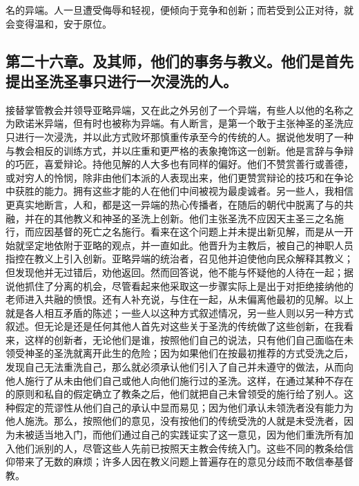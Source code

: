 名的异端。人一旦遭受侮辱和轻视，便倾向于竞争和创新；而若受到公正对待，就会变得温和，安于原位。\par


\subsection{第二十六章。及其师，他们的事务与教义。他们是首先提出圣洗圣事只进行一次浸洗的人。}

接替掌管教会并领导亚略异端，又在此之外另创了一个异端，有些人以他的名称之为欧诺米异端，但有时也被称为异端。有人断言，是第一个敢于主张神圣的圣洗应只进行一次浸洗，并以此方式败坏那慎重传承至今的传统的人。据说他发明了一种与教会相反的训练方式，并以庄重和更严格的表象掩饰这一创新。他是言辞与争辩的巧匠，喜爱辩论。持他见解的人大多也有同样的偏好。他们不赞赏善行或善德，或对穷人的怜悯，除非由他们本派的人表现出来，他们更赞赏辩论的技巧和在争论中获胜的能力。拥有这些才能的人在他们中间被视为最虔诚者。另一些人，我相信更真实地断言，人和，都是这一异端的热心传播者，在随后的朝代中脱离了与的共融，并在的其他教义和神圣的圣洗上创新。他们主张圣洗不应因天主圣三之名施行，而应因基督的死亡之名施行。看来在这个问题上并未提出新见解，而是从一开始就坚定地依附于亚略的观点，并一直如此。他晋升为主教后，被自己的神职人员指控在教义上引入创新。亚略异端的统治者，召见他并迫使他向民众解释其教义；但发现他并无过错后，劝他返回。然而回答说，他不能与怀疑他的人待在一起；据说他抓住了分离的机会，尽管看起来他采取这一步骤实际上是出于对拒绝接纳他的老师进入共融的愤恨。还有人补充说，与住在一起，从未偏离他最初的见解。以上就是各人相互矛盾的陈述；一些人以这种方式叙述情况，另一些人则以另一种方式叙述。但无论是还是任何其他人首先对这些关于圣洗的传统做了这些创新，在我看来，这样的创新者，无论他们是谁，按照他们自己的说法，只有他们自己面临在未领受神圣的圣洗就离开此生的危险；因为如果他们在按最初推荐的方式受洗之后，发现自己无法重洗自己，那么就必须承认他们引入了自己并未遵守的做法，从而向他人施行了从未由他们自己或他人向他们施行过的圣洗。这样，在通过某种不存在的原则和私自的假定确立了教条之后，他们就把自己未曾领受的施行给了别人。这种假定的荒谬性从他们自己的承认中显而易见；因为他们承认未领洗者没有能力为他人施洗。那么，按照他们的意见，没有按他们的传统受洗的人就是未受洗者，因为未被适当地入门，而他们通过自己的实践证实了这一意见，因为他们重洗所有加入他们派别的人，尽管这些人先前已按照天主教会传统入门。这些不同的教条给信仰带来了无数的麻烦；许多人因在教义问题上普遍存在的意见分歧而不敢信奉基督教。\par

